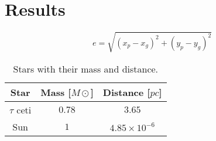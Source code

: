 \section{Results}

\begin{equation}
    e=\sqrt{(x_p-x_g)^2+(y_p-y_g)^2}
\end{equation}

\begin{table}
    \centering
	\caption{Stars with their mass and distance.}
	\label{tab:stars and mass}
	\begin{tabular}{ccc}
		\toprule
		Star & Mass [$M\odot$]  & Distance [$pc$] \\
		\midrule
		$\tau$ ceti & $0.78$ & $3.65$\\
		Sun & $1$ & $4.85\times 10^{-6}$\\
		\bottomrule
	\end{tabular}
\end{table}

